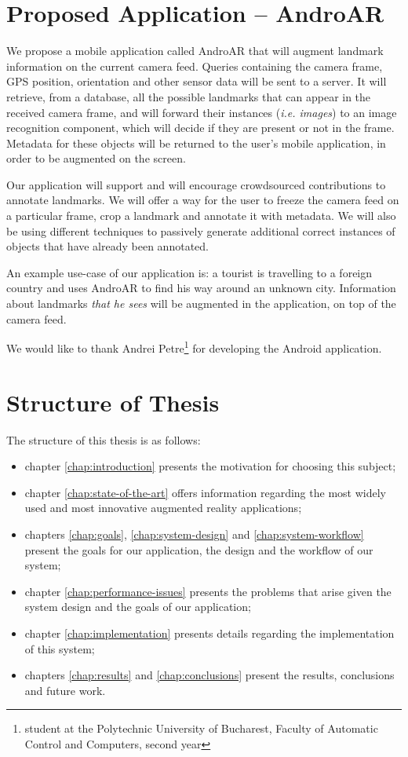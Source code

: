 \documentclass[a4paper,onecolumn,oneside,titlepage,11pt]{report}
\begin{document}
\section{Proposed Application -- AndroAR}
We propose a mobile application called AndroAR that will augment landmark information on the current camera feed. Queries containing the camera frame, GPS position, orientation and other sensor data will be sent to a server. It will retrieve, from a database, all the possible landmarks that can appear in the received camera frame, and will forward their instances (\emph{i.e. images}) to an image recognition component, which will decide if they are present or not in the frame. Metadata for these objects will be returned to the user's mobile application, in order to be augmented on the screen.

Our application will support and will encourage crowdsourced contributions to annotate landmarks. We will offer a way for the user to freeze the camera feed on a particular frame, crop a landmark and annotate it with metadata. We will also be using different techniques to passively generate additional correct instances of objects that have already been annotated.

An example use-case of our application is: a tourist is travelling to a foreign country and uses AndroAR to find his way around an unknown city. Information about landmarks \emph{that he sees} will be augmented in the application, on top of the camera feed.

We would like to thank Andrei Petre\footnote{student at the Polytechnic University of Bucharest, Faculty of Automatic Control and Computers, second year} for developing the Android application.
\section{Structure of Thesis}
The structure of this thesis is as follows:
\begin{itemize}
	\item chapter \ref{chap:introduction} presents the motivation for choosing this subject;
	\item chapter \ref{chap:state-of-the-art} offers information regarding the most widely used and most innovative augmented reality applications;
	\item chapters \ref{chap:goals}, \ref{chap:system-design} and \ref{chap:system-workflow} present the goals for our application, the design and the workflow of our system;
	\item chapter \ref{chap:performance-issues} presents the problems that arise given the system design and the goals of our application;
	\item chapter \ref{chap:implementation} presents details regarding the  implementation of this system;
	\item chapters \ref{chap:results} and \ref{chap:conclusions} present the results, conclusions and future work.
\end{itemize}
\end{document}
